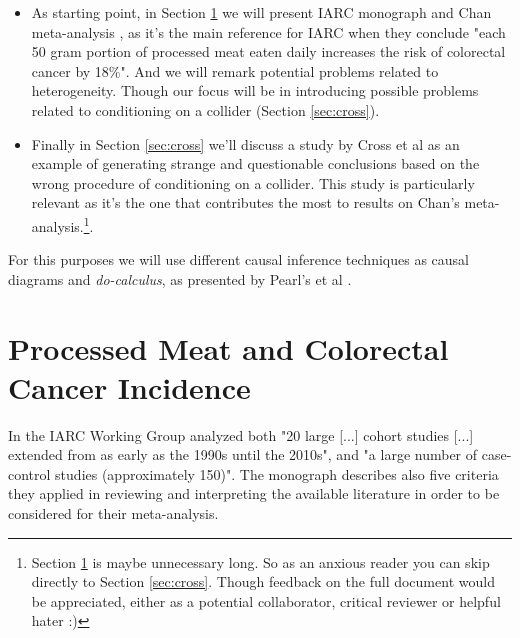 \documentclass{article}
\begin{document}
\begin{itemize}

\item As starting point, in Section \ref{sec:iarc} we will present IARC monograph and Chan meta-analysis \cite{chan}, as it's the main reference for IARC when they conclude "each 50 gram portion of processed meat eaten daily increases the risk of colorectal cancer by 18\%". And we will remark potential problems related to heterogeneity. Though our focus will be in introducing possible problems related to %
conditioning on a collider (Section \ref{sec:cross}).
\item Finally in Section \ref{sec:cross} we'll discuss a study by Cross et al \cite{cross} as an example of generating strange and questionable conclusions based on the wrong procedure of conditioning on a collider. This study is particularly relevant as it's the one that contributes the most to results on Chan's meta-analysis.\footnote{%
Section \ref{sec:iarc} is maybe unnecessary long. So as an anxious reader you can skip directly to Section \ref{sec:cross}. Though feedback on the full document would be appreciated, either as a potential collaborator, critical reviewer or helpful hater :)}.

\end{itemize}

For this purposes we will use different causal inference techniques as causal diagrams and \textit{do-calculus}, as presented by Pearl's et al \cite{bookofwhy}.

\section{Processed Meat and Colorectal Cancer Incidence}
\label{sec:iarc}

In \cite{monograph} the IARC Working Group analyzed both "20 large [...] cohort studies [...] extended from as early as the 1990s until the 2010s", and "a large number of case-control studies (approximately 150)". The monograph describes also five criteria they applied in reviewing and interpreting the available literature in order to be considered for their meta-analysis. %
\end{document}

